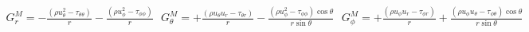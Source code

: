 \documentclass[10pt,paper=a4]{report}
\begin{document}
\begin{align}
G_r^M = -\frac{(\rho u_{\theta}^{2} - \tau_{\theta\theta})}{r} - \frac{(\rho u_{\phi}^{2} - \tau_{\phi\phi})}{r} \ \ \ G_\theta^M = + \frac{(\rho u_{\theta} u_{r} - \tau_{\theta r})}{r} -  \frac{(\rho u_{\phi}^{2} - \tau_{\phi\phi}) \cos{\theta}}{r \sin{\theta}} \ \ \ G_\phi^M = + \frac{(\rho u_{\phi} u_{r} - \tau_{\phi r})}{r} +  \frac{(\rho u_{\phi} u_{\theta} - \tau_{\phi \theta})\cos{\theta}}{r \sin{\theta}}
\end{align}




\end{document}
